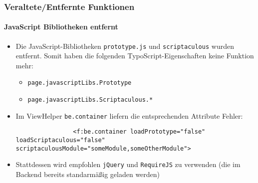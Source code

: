 \begin{frame}[fragile]
	\frametitle{Veraltete/Entfernte Funktionen}
	\framesubtitle{JavaScript Bibliotheken entfernt}

	\begin{itemize}

		\item Die JavaScript-Bibliotheken \texttt{prototype.js} und \texttt{scriptaculous} wurden entfernt.
			Somit haben die folgenden TypoScript-Eigenschaften keine Funktion mehr:

			\begin{itemize}
				\item \texttt{page.javascriptLibs.Prototype}
				\item \texttt{page.javascriptLibs.Scriptaculous.*}
			\end{itemize}

		\item Im ViewHelper \texttt{be.container} liefern die entsprechenden Attribute Fehler:
			\begin{lstlisting}
				<f:be.container loadPrototype="false" loadScriptaculous="false" scriptaculousModule="someModule,someOtherModule">
			\end{lstlisting}

		\item Stattdessen wird empfohlen \texttt{jQuery} und \texttt{RequireJS} zu verwenden
			(die im Backend bereits standarmäßig geladen werden)

	\end{itemize}

\end{frame}


